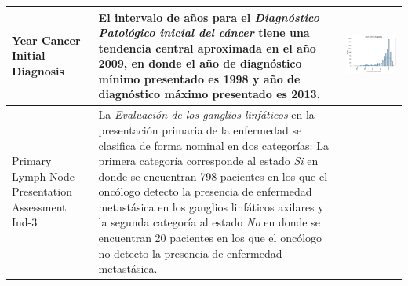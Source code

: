 \begin{table}[!htb]
	\footnotesize
	\begin{threeparttable}
		\begin{tabular}{p{2.5cm} p{7cm} p{6.5cm}} \toprule
			Year Cancer Initial Diagnosis
			& El intervalo de años para el \textit{Diagnóstico Patológico inicial del cáncer} tiene una tendencia central aproximada en el año 2009, en donde el año de diagnóstico mínimo presentado es 1998 y año de diagnóstico máximo presentado es 2013.
			
			& \begin{center}\includegraphics[width=1\linewidth]{NOTEBOOK/IMAGENES_DESCRIPTIVAS/27_year_initial_diagnosis}\end{center}
			\\ \hline
			
			Primary Lymph Node Presentation Assessment Ind-3
			& La \textit{Evaluación de los ganglios linfáticos} en la presentación primaria de la enfermedad se clasifica de forma nominal en dos categorías: La primera categoría corresponde al estado \textit{Si} en donde se encuentran 798 pacientes en los que el oncólogo detecto la presencia de enfermedad metastásica en los ganglios linfáticos axilares y la segunda categoría al estado \textit{No} en donde se encuentran 20 pacientes en los que el oncólogo no detecto la presencia de enfermedad metastásica.
			

\end{tabular}
\end{threeparttable}
\end{table}
